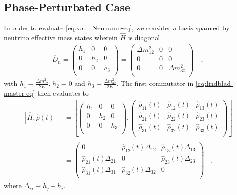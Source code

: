 \subsection{Phase-Perturbated Case}
In order to evaluate \cref{eq:von_Neumann-eq}, we consider a basis spanned by neutrino effective mass states wherein $\hat{H}$ is diagonal
%
    \begin{align} \label{eq:diagonal_Hamiltonian}
        \hat{D}_n 
        =
    \begin{pmatrix}
        h_1 & 0 & 0 \\
        0 & h_2 & 0 \\
        0 & 0 & h_3 \\
    \end{pmatrix}
    =
    \begin{pmatrix}
        \Delta m^2_{12} & 0 & 0 \\
        0 & 0 & 0 \\
        0 & 0 & \Delta m^2_{32} \\
    \end{pmatrix}   
        \quad \text{,}
    \end{align}
%
with $h_1 = \frac{\Delta m^2_{12}}{2E}$, $h_2 = 0$ and $h_3 = \frac{\Delta m^2_{32}}{2E}$. The first commutator in \cref{eq:lindblad-master-eq} then evaluates to
%
    \begin{align} \label{eq:Hamiltonian_commutator}
        [\hat{H},\hat{\rho}(t)]
        &=
    \left[
    \begin{pmatrix}
        h_1 & 0 & 0 \\
        0 & h_2 & 0 \\
        0 & 0 & h_3 \\
    \end{pmatrix}
    ,
    \begin{pmatrix}
        \hat{\rho}_{11}(t) & \hat{\rho}_{12}(t) & \hat{\rho}_{13}(t) \\
        \hat{\rho}_{21}(t) & \hat{\rho}_{22}(t) & \hat{\rho}_{23}(t) \\
        \hat{\rho}_{31}(t) & \hat{\rho}_{32}(t) & \hat{\rho}_{33}(t) \\
    \end{pmatrix}
    \right] \\ \\
    &=
    \begin{pmatrix}
        0 & \hat{\rho}_{12}(t)\Delta_{12} & \hat{\rho}_{13}(t)\Delta_{13} \\
        \hat{\rho}_{21}(t)\Delta_{21} & 0 & \hat{\rho}_{23}(t)\Delta_{23} \\
        \hat{\rho}_{31}(t)\Delta_{31} & \hat{\rho}_{32}(t)\Delta_{32} & 0 \\
    \end{pmatrix}    
        \quad \text{,}
    \end{align}
%
where $\Delta_{ij}\equiv h_j - h_i$. 

